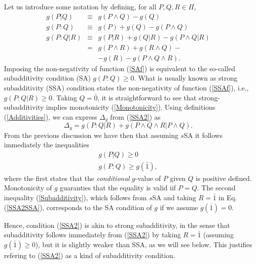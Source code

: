 \documentclass[twocolumn,aps,sort,nofootinbib]{revtex4}
\begin{document}
\begin{appendix}
Let us introduce some notation by defining, for all $P, Q, R \in \Pi$,
\begin{subequations}
\begin{eqnarray}
g(P|Q) &\equiv & g(P\wedge Q) - g(Q) \\
g(P:Q)&\equiv & g(P) + g(Q) - g(P\wedge Q) \label{SAf}\\
g(P:Q|R)&\equiv & g(P|R) + g(Q|R) - g(P\wedge Q|R) \nonumber \\
& = & g(P\wedge R) + g(R\wedge Q) - \nonumber \\
& & - g(R) - g(P\wedge Q \wedge R) . \label{SSAf}
\end{eqnarray}
\label{Additivities}
\end{subequations}
Imposing the non-negativity of function (\ref{SAf}) is equivalent to the so-called subadditivity 
condition (SA) $g(P:Q)\ge 0$. What is usually known as strong subadditivity (SSA)
condition \cite{Ruelle67} states the non-negativity
of function (\ref{SSAf}), i.e., $g(P:Q|R)\ge 0$.
Taking $Q=\bar{0}$, it is straightforward to see that
strong-subadditivity implies monotonicity (\ref{Monotonicity}).
Using %
definitions (\ref{Additivities}), we can express $\Delta_g$ from (\ref{SSA2}) as
\begin{equation}
\Delta_g  = g(P:Q|R) + g(P\wedge Q\wedge R|P\wedge Q).
\label{SSA2SSA}
\end{equation}
\figsSA
From the previous discussion we have then that assuming $s$SA it follows
immediately the inequalities
\begin{eqnarray}
g(P|Q)\geq 0 \label{ConditionalEntropy}\\
g(P:Q)\geq g(\bar{1}) \label{Subadditivity},
\end{eqnarray}
where the first states that the {\sl conditional} $g$-value of $P$ given $Q$
is positive defined. Monotonicity of $g$ guaranties that the equality is valid iif $P=Q$. 
The second inequality (\ref{Subadditivity}),
which follows from $s$SA and taking $R=\bar{1}$ in Eq.(\ref{SSA2SSA}), 
corresponds to the SA condition of $g$ if we assume $g(\bar{1})=0$. 

Hence, condition (\ref{SSA2}) is akin to strong subadditivity, in the
sense that subadditivity follows immediately from (\ref{SSA2}) 
by taking $R=\bar{1}$ (assuming $g(\bar{1})\ge 0$), 
but it is slightly weaker than SSA, as we will see below.  
This justifies refering to (\ref{SSA2}) as a kind of subadditivity condition.


\end{appendix}
\end{document}
